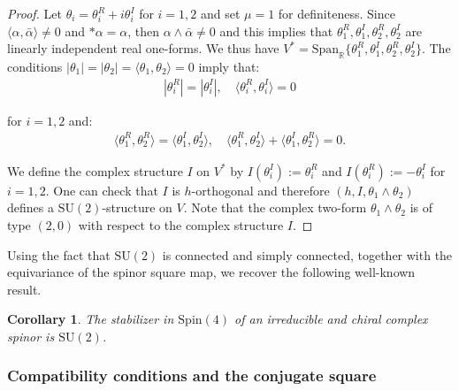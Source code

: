\documentclass[10pt,a4paper,twoside,reqno]{amsart}
\theoremstyle{plain}
\newtheorem{cor}[thm]{Corollary}
\theoremstyle{definition}
\theoremstyle{remark}
\def\R{\mathbb{R}}
\def\Spin{\mathrm{Spin}}
\def\Spin{\mathrm{Spin}}
\def\SU{\mathrm{SU}}
\def\R{\mathbb{R}}
\newcommand{\abs}[1]{\left\lvert#1\right\rvert}
\newcommand{\escal}[1]{\langle#1\rangle}
\def\Span{\mathrm{Span}}
\begin{document}
\begin{proof}
Let $\theta_i=\theta_i^R+i\theta_i^I$ for $i=1,2$ and set $\mu = 1$ for definiteness. Since $\escal{\alpha,\bar\alpha}\neq0$ and $*\alpha=\alpha$, then $\alpha\wedge\bar\alpha\neq0$ and this implies that $\theta_1^R,\theta_1^I,\theta_2^R,\theta_2^I$ are linearly independent real one-forms. We thus have $V^*=\Span_\R\{\theta_1^R,\theta_1^I,\theta_2^R,\theta_2^I\}$. The conditions $\abs{\theta_1}=\abs{\theta_2}=\escal{\theta_1,\theta_2}=0$ imply that:
\begin{eqnarray*}
\abs{\theta_i^R}=\abs{\theta_i^I},\quad\escal{\theta_i^R,\theta_i^I}=0
\end{eqnarray*}

\noindent
for $i=1,2$ and:
\begin{eqnarray*}
\escal{\theta_1^R,\theta_2^R}=\escal{\theta_1^I,\theta_2^I},\quad\escal{\theta_1^R,\theta_2^I}+\escal{\theta_1^I,\theta_2^R}=0.
\end{eqnarray*}

\noindent
We define the complex structure $I$ on $V^*$ by $I(\theta_i^I):=\theta_i^R$ and $I(\theta_i^R):=-\theta_i^I$ for $i=1,2$. One can check that $I$ is $h$-orthogonal and therefore $(h,I,\theta_1\wedge\theta_2)$ defines a $\SU(2)$-structure on $V$. Note that the complex two-form $\theta_1\wedge\theta_2$ is of type $(2,0)$ with respect to the complex structure $I$.
\end{proof}

\noindent
Using the fact that $\SU(2)$ is connected and simply connected, together with the equivariance of the spinor square map, we recover the following well-known result.

\begin{cor}
The stabilizer in $\Spin(4)$ of an irreducible and chiral complex spinor is $\SU(2)$.
\end{cor}


\subsubsection{Compatibility conditions and the conjugate square}

\end{document}
